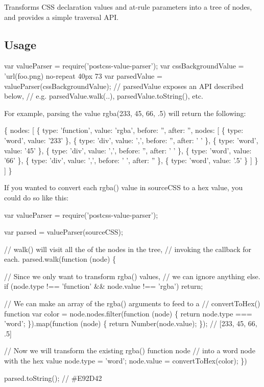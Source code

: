 \href{https://travis-ci.org/TrySound/postcss-value-parser}{\tt }

Transforms C\+SS declaration values and at-\/rule parameters into a tree of nodes, and provides a simple traversal A\+PI.

\subsection*{Usage}


\begin{DoxyCode}
var valueParser = require('postcss-value-parser');
var cssBackgroundValue = 'url(foo.png) no-repeat 40px 73%
var parsedValue = valueParser(cssBackgroundValue);
// parsedValue exposes an API described below,
// e.g. parsedValue.walk(..), parsedValue.toString(), etc.
\end{DoxyCode}


For example, parsing the value {\ttfamily rgba(233, 45, 66, .5)} will return the following\+:


\begin{DoxyCode}
\{
  nodes: [
    \{
      type: 'function',
      value: 'rgba',
      before: '',
      after: '',
      nodes: [
        \{ type: 'word', value: '233' \},
        \{ type: 'div', value: ',', before: '', after: ' ' \},
        \{ type: 'word', value: '45' \},
        \{ type: 'div', value: ',', before: '', after: ' ' \},
        \{ type: 'word', value: '66' \},
        \{ type: 'div', value: ',', before: ' ', after: '' \},
        \{ type: 'word', value: '.5' \}
      ]
    \}
  ]
\}
\end{DoxyCode}


If you wanted to convert each {\ttfamily rgba()} value in {\ttfamily source\+C\+SS} to a hex value, you could do so like this\+:


\begin{DoxyCode}
var valueParser = require('postcss-value-parser');

var parsed = valueParser(sourceCSS);

// walk() will visit all the of the nodes in the tree,
// invoking the callback for each.
parsed.walk(function (node) \{

  // Since we only want to transform rgba() values,
  // we can ignore anything else.
  if (node.type !== 'function' && node.value !== 'rgba') return;

  // We can make an array of the rgba() arguments to feed to a
  // convertToHex() function
  var color = node.nodes.filter(function (node) \{
    return node.type === 'word';
  \}).map(function (node) \{
    return Number(node.value);
  \}); // [233, 45, 66, .5]

  // Now we will transform the existing rgba() function node
  // into a word node with the hex value
  node.type = 'word';
  node.value = convertToHex(color);
\})

parsed.toString(); // #E92D42
\end{DoxyCode}


